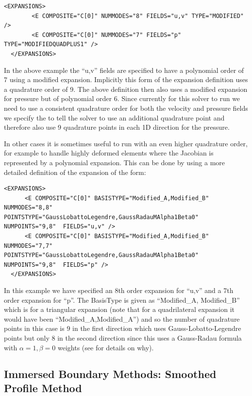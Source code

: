 \begin{lstlisting}[style=XMLStyle]
  <EXPANSIONS>
        <E COMPOSITE="C[0]" NUMMODES="8" FIELDS="u,v" TYPE="MODIFIED" />
        <E COMPOSITE="C[0]" NUMMODES="7" FIELDS="p"   TYPE="MODIFIEDQUADPLUS1" />
  </EXPANSIONS>
\end{lstlisting}

In the above example the ``u,v'' fields are specified to have a
polynomial order of 7 using a modified expansion. Implicitly this form
of the expansion definition uses a quadrature order of 9. The above
definition then also uses a modified expansion for pressure but of polynomial
order 6. Since currently for this solver to run we need to use a
consistent quadrature order for both the velocity and pressure fields
we specify the  to tell the solver to use an
additional quadrature point and therefore also use 9 quadrature points in
each 1D direction for the pressure.

In other cases it is sometimes useful to run with an even higher
quadrature order, for example to handle highly deformed elements where
the Jacobian is represented by a polynomial expansion. This can be done
by using a more detailed definition of the expansion of the form:


\begin{lstlisting}[style=XMLStyle]
  <EXPANSIONS>
      <E COMPOSITE="C[0]" BASISTYPE="Modified_A,Modified_B" NUMMODES="8,8" POINTSTYPE="GaussLobattoLegendre,GaussRadauMAlpha1Beta0" NUMPOINTS="9,8"  FIELDS="u,v" />
      <E COMPOSITE="C[0]" BASISTYPE="Modified_A,Modified_B" NUMMODES="7,7" POINTSTYPE="GaussLobattoLegendre,GaussRadauMAlpha1Beta0" NUMPOINTS="9,8"  FIELDS="p" />
  </EXPANSIONS>
\end{lstlisting}

In this example we have specified an 8th order expansion for ``u,v''
and a 7th order expansion for ``p''. The BasisType is given as
``Modified\_A, Modified\_B'' which is for a triangular expansion (note that for
a quadrilateral expansion it would have been ``Modified\_A,Modified\_A'')
and so the number of quadrature points in this case is 9 in the first
direction which uses Gauss-Lobatto-Legendre points but only 8 in the
second direction since this uses a Gauss-Radau formula with
$\alpha=1,\beta=0$ weights (see \cite{KaSh05} for details on why).

\subsection{Immersed Boundary Methods: Smoothed Profile Method}

